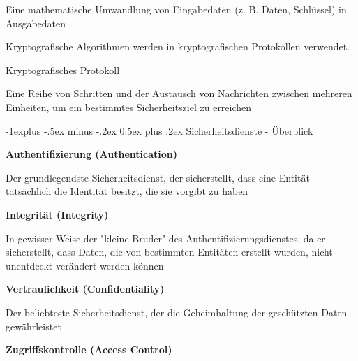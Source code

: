 \documentclass[a4paper]{article}
\makeatletter
\renewcommand{\subsection}{\@startsection{subsection}{2}{0mm}%
 {-1explus -.5ex minus -.2ex}%
 {0.5ex plus .2ex}%
 {\normalfont\normalsize\bfseries}}
\makeatother
\begin{document}
\begin{multicols}{3}
\begin{itemize*}
            \begin{itemize*}
                  \item Eine mathematische Umwandlung von Eingabedaten (z. B. Daten, Schlüssel) in Ausgabedaten
                  \item Kryptografische Algorithmen werden in kryptografischen Protokollen verwendet.
            \end{itemize*}
            \item
            Kryptografisches Protokoll

            \begin{itemize*}
                  \item Eine Reihe von Schritten und der Austausch von Nachrichten zwischen mehreren Einheiten, um ein bestimmtes Sicherheitsziel zu erreichen
            \end{itemize*}
      \end{itemize*}


      \subsection{Sicherheitsdienste -
            Überblick}

      \begin{itemize*}
            \item
            \textbf{Authentifizierung (Authentication)}

            \begin{itemize*}
                  \item Der grundlegendste Sicherheitsdienst, der sicherstellt, dass eine Entität tatsächlich die Identität besitzt, die sie vorgibt zu haben
            \end{itemize*}
            \item
            \textbf{Integrität (Integrity)}

            \begin{itemize*}
                  \item In gewisser Weise der "kleine Bruder" des Authentifizierungsdienstes, da er sicherstellt, dass Daten, die von bestimmten Entitäten erstellt wurden, nicht unentdeckt verändert werden können
            \end{itemize*}
            \item
            \textbf{Vertraulichkeit (Confidentiality)}

            \begin{itemize*}
                  \item Der beliebteste Sicherheitsdienst, der die Geheimhaltung der geschützten Daten gewährleistet
            \end{itemize*}
            \item
            \textbf{Zugriffskontrolle (Access Control)}


\end{itemize*}
\end{multicols}
\end{document}
